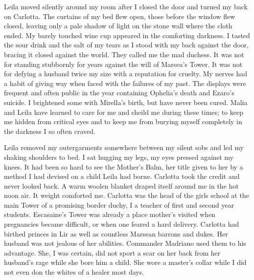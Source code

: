 \documentclass{article}
\begin{document}
Leila moved silently around my room after I closed the door and turned my back on Carlotta. The curtains of my bed flew open, those before the window flew closed, leaving only a pale shadow of light on the stone wall where the cloth ended. My barely touched wine cup appeared in the comforting darkness. I tasted the sour drink and the salt of my tears as I stood with my back against the door, bracing it closed against the world. They called me the mad duchess. It was not for standing stubbornly for years against the will of Marsea's Tower. It was not for defying a husband twice my size with a reputation for cruelty. My nerves had a habit of giving way when faced with the failures of my past. The displays were frequent and often public in the year containing Ophelia's death and Ezaro's suicide. I brightened some with Mirella's birth, but have never been cured. Malia and Leila have learned to care for me and sheild me during these times; to keep me hidden from critical eyes and to keep me from burying myself completely in the darkness I so often craved.

Leila removed my outergarments somewhere between my silent sobs and led my shaking shoulders to bed. I sat hugging my legs, my eyes pressed against my knees. It had been so hard to see the Mother's Balm, her title given to her by a method I had devised on a child Leila had borne. Carlotta took the credit and never looked back. A warm woolen blanket draped itself around me in the hot noon air. It weight comforted me. Carlotta was the head of the girls school at the main Tower of a promising border duchy, I a teacher of first and second year students. Escasaine's Tower was already a place mother's visited when pregnancies became difficult, or when one feared a hard delivery. Carlotta had birthed princes in Lir as well as countless Marsean barrons and dukes. Her husband was not jealous of her abilities. Commander Madriano used them to his advantage. She, I was certain, did not sport a scar on her back from her husband's rage while she bore him a child. She wore a master's collar while I did not even don the whites of a healer most days. 
\end{document}
